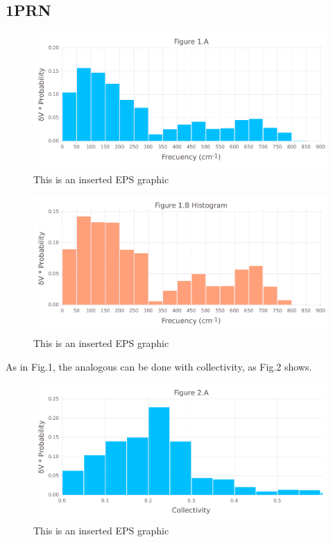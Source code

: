 \documentclass[10pt,letterpaper]{article}
\begin{document}
\FloatBarrier
\newpage

\subsection{1PRN}

\begin{figure}[ht]
\begin{center}
\includegraphics[scale=0.5]{1prn/1afigure_hi-precision.pdf}
\caption{This is an inserted EPS graphic}
\label{fig1}
\end{center}
\end{figure}

\begin{figure}[ht]
\begin{center}
\includegraphics[scale=0.5]{1prn/1bfigure_hi-precision.pdf}
\caption{This is an inserted EPS graphic}
\label{fig2}
\end{center}
\end{figure}

\clearpage
As in Fig.1, the analogous can be done with collectivity, as Fig.2 shows.

\begin{figure}[ht]
\begin{center}
\includegraphics[scale=0.5]{1prn/2afigure_hi-precision.pdf}
\caption{This is an inserted EPS graphic}
\label{fig3}
\end{center}
\end{figure}
\end{document}
